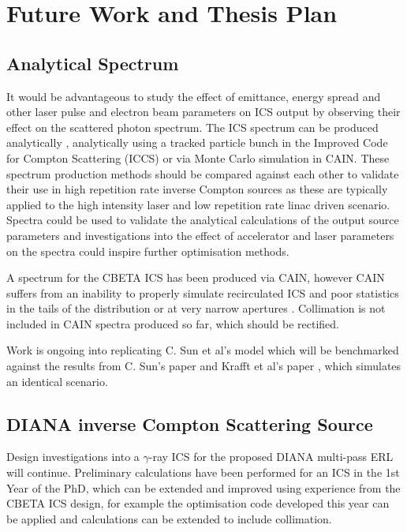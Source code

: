 \documentclass[10pt]{article}
\begin{document}
\section*{Future Work and Thesis Plan}

\subsection*{Analytical Spectrum}

It would be advantageous to study the effect of emittance, energy spread and other laser pulse and electron beam parameters on ICS output by observing their effect on the scattered photon spectrum. The ICS spectrum can be produced analytically \cite{sun2009energy}, analytically using a tracked particle bunch in the Improved Code for Compton Scattering (ICCS) \cite{ranjan2018simulation} or via Monte Carlo simulation in CAIN. These spectrum production methods should be compared against each other to validate their use in high repetition rate inverse Compton sources as these are typically applied to the high intensity laser and low repetition rate linac driven scenario. Spectra could be used to validate the analytical calculations of the output source parameters and investigations into the effect of accelerator and laser parameters on the spectra could inspire further optimisation methods. 

A spectrum for the CBETA ICS has been produced via CAIN, however CAIN suffers from an inability to properly simulate recirculated ICS and poor statistics in the tails of the distribution or at very narrow apertures \cite{ranjan2018simulation}. Collimation is not included in CAIN spectra produced so far, which should be rectified. 

Work is ongoing into replicating C. Sun et al's \cite{sun2009energy} model which will be benchmarked against the results from C. Sun's paper and Krafft et al's paper \cite{ranjan2018simulation}, which simulates an identical scenario. 

\subsection*{DIANA inverse Compton Scattering Source}

Design investigations into a $\gamma$-ray ICS for the proposed DIANA multi-pass ERL will continue. Preliminary calculations have been performed for an ICS in the 1st Year of the PhD, which can be extended and improved using experience from the CBETA ICS design, for example the optimisation code developed this year can be applied and calculations can be extended to include collimation.
 
\end{document}
